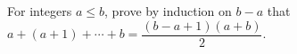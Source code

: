 For integers $a\le b$, prove by induction on $b-a$ that $a+(a+1)+\cdots+b=\dfrac{(b-a+1)(a+b)}{2}$.
